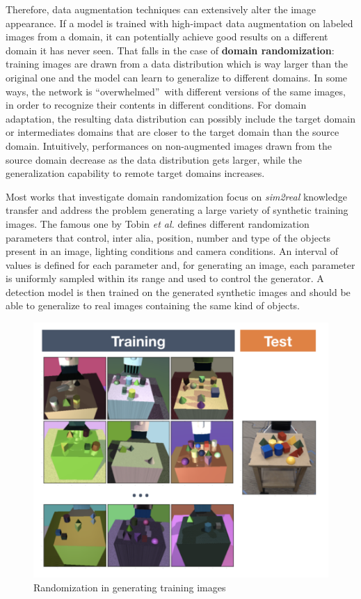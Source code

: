 \documentclass[%
    corpo=12pt,
    twoside,
    stile=classica,   
    tipotesi=magistrale,
    evenboxes,
    english,
	numerazioneromana,
]{toptesi}
\begin{document}
Therefore, data augmentation techniques can extensively alter the image appearance. If a model is trained with high-impact data augmentation on labeled images from a domain, it can potentially achieve good results on a different domain it has never seen. That falls in the case of \textbf{domain randomization}: training images are drawn from a data distribution which is way larger than the original one and the model can learn to generalize to different domains. In some ways, the network is \textquotedblleft overwhelmed\textquotedblright~with different versions of the same images, in order to recognize their contents in different conditions. For domain adaptation, the resulting data distribution can possibly include the target domain or intermediates domains that are closer to the target domain than the source domain. Intuitively, performances on non-augmented images drawn from the source domain decrease as the data distribution gets larger, while the generalization capability to remote target domains increases.

\bigskip
Most works that investigate domain randomization focus on \textit{sim2real} knowledge transfer and address the problem generating a large variety of synthetic training images. The famous one by Tobin \textit{et al.}\cite{tobin2017domain} defines different randomization parameters that control, inter alia, position, number and type of the objects present in an image, lighting conditions and camera conditions. An interval of values is defined for each parameter and, for generating an image, each parameter is uniformly sampled within its range and used to control the generator. A detection model is then trained on the generated synthetic images and should be able to generalize to real images containing the same kind of objects.

\begin{figure}[ht!]
	\centering
	\includegraphics[width=0.8\linewidth]{imgs/randomization.png}
	\caption{Randomization in generating training images\cite{tobin2017domain}}
	\label{fig:randomization}
\end{figure}
\end{document}
